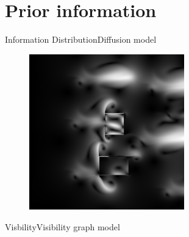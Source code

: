 \section{Prior information}

\begin{frame}{Information Distribution}{Diffusion model}

\begin{figure}
\centering
\includegraphics[width = 0.6\textwidth]{./screenshot/diffusion.png}
\end{figure}

\end{frame}

\begin{frame}{Visbility}{Visibility graph model}

\end{frame}